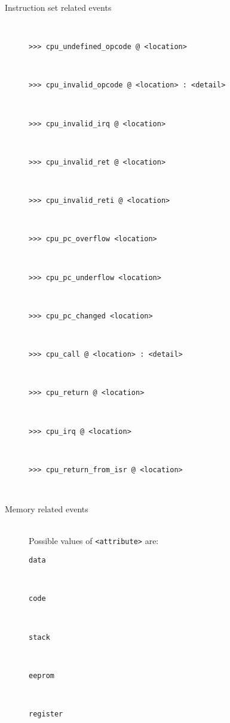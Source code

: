 \begin{description}
            \item[Instruction set related events]~\\
                \begin{description}
                    \item[\texttt{>{}>{}> cpu\_undefined\_opcode @ <location>}]~\\
                    \item[\texttt{>{}>{}> cpu\_invalid\_opcode @ <location> : <detail>}]~\\
                    \item[\texttt{>{}>{}> cpu\_invalid\_irq @ <location>}]~\\
                    \item[\texttt{>{}>{}> cpu\_invalid\_ret @ <location>}]~\\
                    \item[\texttt{>{}>{}> cpu\_invalid\_reti @ <location>}]~\\
                    \item[\texttt{>{}>{}> cpu\_pc\_overflow <location>}]~\\
                    \item[\texttt{>{}>{}> cpu\_pc\_underflow <location>}]~\\
                    \item[\texttt{>{}>{}> cpu\_pc\_changed <location>}]~\\
                    \item[\texttt{>{}>{}> cpu\_call @ <location> : <detail>}]~\\
                    \item[\texttt{>{}>{}> cpu\_return @ <location>}]~\\
                    \item[\texttt{>{}>{}> cpu\_irq @ <location>}]~\\
                    \item[\texttt{>{}>{}> cpu\_return\_from\_isr @ <location>}]~\\
                \end{description}

            \item[Memory related events]~\\
                Possible values of \texttt{<attribute>} are:
                \begin{description}
                    \item[\texttt{data}]~\\
                    \item[\texttt{code}]~\\
                    \item[\texttt{stack}]~\\
                    \item[\texttt{eeprom}]~\\
                    \item[\texttt{register}]~\\
                \end{description}


\end{description}
